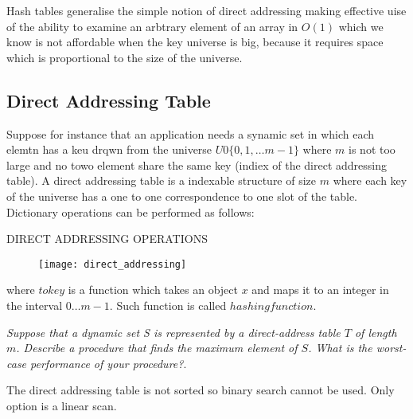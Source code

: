 Hash tables generalise the simple notion of direct addressing making effective uise of the ability to examine an arbtrary element of an array in $O(1)$ which we know is not affordable when the key universe is big, because it requires space which is proportional to the size of the universe. 
\subsection{Direct Addressing Table}
Suppose for instance that an application needs a synamic set in which each elemtn has a keu drqwn from the universe $U 0 \{0,1,\ldots m-1\} $ where $m$ is not too large and no towo element share the same key (indiex of the direct addressing table).
A direct addressing table is a indexable structure of size $m$ where each key of the universe has a one to one correspondence to one slot of the table. 
Dictionary operations can be performed as follows:

\begin{algorithm}
\caption{DIRECT ADDRESSING OPERATIONS}
\end{algorithm}

	\begin{figure}
	\label{fig:directaddressing}
	\centering
		\texttt{[image: direct\_addressing]}
	\end{figure}

where $tokey$ is a function which takes an object $x$ and maps it to an integer in the interval $0\ldots m-1$. Such function is called $hashing function$. 
\begin{problem}
\textit{Suppose that a dynamic set S is represented by a direct-address table $T$ of length $m$. Describe a procedure that finds the maximum element of $S$. What is the worst-case performance of your procedure?}.

\begin{solution}
The direct addressing table is not sorted so binary search cannot be used. Only option is a linear scan.
\end{solution}
\end{problem}

